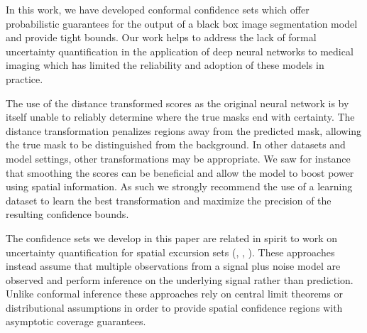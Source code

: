 In this work, we have developed conformal confidence sets which offer probabilistic guarantees for the output of a black box image segmentation model and provide tight bounds. Our work helps to address the lack of formal uncertainty quantification in the application of deep neural networks to medical imaging which has limited the reliability and adoption of these models in practice. 

The use of the distance transformed scores  as the original neural network is by itself unable to reliably determine where the true masks end with certainty. The distance transformation penalizes regions away from the predicted mask, allowing the true mask to be distinguished from the background. In other datasets and model settings, other transformations may be appropriate. We saw for instance that smoothing the scores can be beneficial and allow the model to boost power using spatial information. As such we strongly recommend the use of a learning dataset to learn the best transformation and maximize the precision of the resulting confidence bounds.


The confidence sets we develop in this paper are related in spirit to work on uncertainty quantification for spatial excursion sets (\cite{chen2017density}, \cite{Bowring2019}, \cite{Mejia2020}). These approaches instead assume that multiple observations from a signal plus noise model are observed and perform inference on the underlying signal rather than prediction. Unlike conformal inference these approaches rely on central limit theorems or distributional assumptions in order to provide spatial confidence regions with asymptotic coverage guarantees. 

